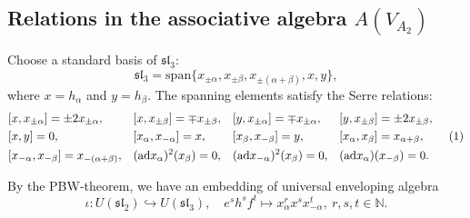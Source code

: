 \documentclass[12pt,a4paper,reqno]{amsart}
\numberwithin{equation}{section}
\numberwithin{equation}{section}
\newcommand\numberthis{\addtocounter{equation}{1}\tag{\theequation}}
\theoremstyle{definition}
\newcommand{\N}{\mathbb{N}}
\def \al{\alpha}
\def\hr{\hookrightarrow}
\def \ga {\gamma}
\def \b {\beta}
\def\spn{\mathrm{span}}
\def\sl{\mathfrak{sl}}
\def\ad{\mathrm{ad}}
\begin{document}
	
	
	
	
	\subsection{Relations in the associative algebra $A(V_{A_2})$}
	Choose a standard basis of $\sl_3$:
	$$\sl_3=\spn\{x_{\pm \al}, x_{\pm \b}, x_{\pm(\al+\b)}, x,y\},$$
	where $x=h_\al$ and $y=h_\b$. The spanning elements satisfy the Serre relations:
	\begin{align*}
		& [x,x_{\pm \al}]=\pm 2x_{\pm \al},&& [x,x_{\pm \b}]=\mp x_{\pm \b},&& [y,x_{\pm \al}]=\mp x_{\pm \al}, && [y,x_{\pm \b}]=\pm 2x _{\pm \b},\\
		& [x,y]=0,&& [x_\al,x_{-\al}]=x,&& [x_\b,x_{-\b}]=y,&& [x_\al,x_\b]=x_{\al+\b},\numberthis\label{eq:serrerel}\\
		& [x_{-\al},x_{-\b}]=x_{-(\al+\b)},&& (\ad x_\al)^2(x_\b)=0,&& (\ad x_{-\al})^2(x_\b)=0,&& (\ad x_\al)(x_{-\b})=0.
	\end{align*}
	
	
	By the PBW-theorem, we have an embedding of universal enveloping algebra
	\begin{equation}\label{eq:iota}
		\iota: U(\sl_2)\hr U(\sl_3),\quad e^s h^s f^t\mapsto x_{\al}^rx^s x_{-\al}^t,\ r,s,t\in \N.
	\end{equation}
	
\end{document}
